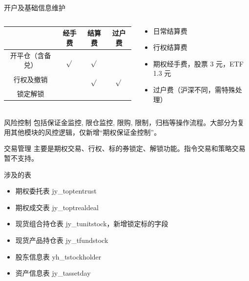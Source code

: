 \documentclass[12pt]{ctexbeamer}	%
\begin{document}
\begin{frame}{开户及基础信息维护}
  \begin{columns}
    \begin{column}{0.70\textwidth}
      \begin{tabular}{ c | c | c | c }
        \hline
         & 经手费 & 结算费 & 过户费 \\
        \hline
        开平仓（含备兑） & $\sqrt{}$ & $\sqrt{}$ &  \\
        \hline
        行权及撤销 &  & $\sqrt{}$ & $\sqrt{}$ \\
        \hline
        锁定解锁 & & & \\
        \hline
      \end{tabular}
    \end{column}
    \begin{column}{0.30\textwidth}
      \begin{itemize}
        \item 日常结算费
        \item 行权结算费
        \item 期权经手费，股票 3 元，ETF 1.3 元
        \item 过户费（沪深不同，需特殊处理）
      \end{itemize}
    \end{column}
  \end{columns}
\end{frame}

\begin{frame}{风险控制}
  包括保证金监控, 限仓监控, 限购, 限制，归档等操作流程。大部分为复用其他模块的风控逻辑，仅新增“期权保证金控制”。
\end{frame}

\begin{frame}{交易管理}
  主要是期权交易、行权、标的券锁定、解锁功能。指令交易和策略交易暂不支持。
  \begin{block}{涉及的表}
    \begin{itemize}
      \item 期权委托表 jy\_toptentrust
      \item 期权成交表 jy\_toptrealdeal
      \item 现货组合持仓表 jy\_tunitstock，新增锁定标的字段
      \item 现货产品持仓表 jy\_tfundstock
      \item 股东信息表 yh\_tstockholder
      \item 资产信息表 jy\_tassetday
    \end{itemize}
  \end{block}
\end{frame}
\end{document}
